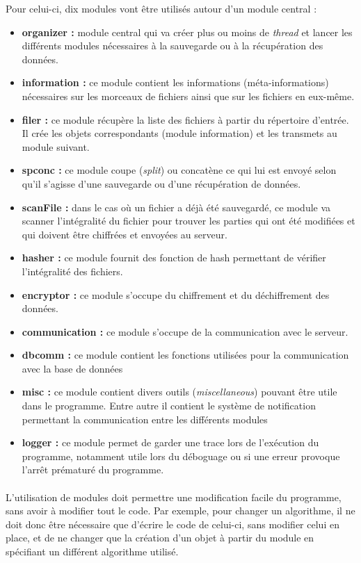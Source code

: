 \documentclass[a4paper,10pt, twoside]{report}
\begin{document}
\begin{spacing}{1.2}
Pour celui-ci, dix modules vont \^etre utilis\'es autour d'un module central :
\begin{itemize}
  \item \textbf{organizer :} module central qui va cr\'eer plus ou moins de
  \textit{thread} et lancer les diff\'erents modules n\'ecessaires \`a la
  sauvegarde ou \`a la r\'ecup\'eration des donn\'ees.
  \item \textbf{information :} ce module contient les informations
  (m\'eta-informations) n\'ecessaires sur les morceaux de fichiers ainsi que
  sur les fichiers en eux-m\^eme.
  \item \textbf{filer :} ce module r\'ecup\`ere la liste des fichiers \`a
  partir du r\'epertoire d'entr\'ee. Il cr\'ee les objets correspondants
  (module information) et les transmets au module suivant.
  \item \textbf{spconc :} ce module coupe (\textit{split}) ou concat\`ene ce
  qui lui est envoy\'e selon qu'il s'agisse d'une sauvegarde ou d'une
  r\'ecup\'eration de donn\'ees.
  \item \textbf{scanFile :} dans le cas o\`u un fichier a d\'ej\`a \'et\'e
  sauvegard\'e, ce module va scanner l'int\'egralit\'e du fichier pour trouver
  les parties qui ont \'et\'e modifi\'ees et qui doivent \^etre chiffr\'ees et
  envoy\'ees au serveur.
  \item \textbf{hasher :} ce module fournit des fonction de hash permettant de
  v\'erifier l'int\'egralit\'e des fichiers.
  \item \textbf{encryptor :} ce module s'occupe du chiffrement et du
  d\'echiffrement des donn\'ees.
  \item \textbf{communication :} ce module s'occupe de la communication avec
  le serveur.
  \item \textbf{dbcomm :} ce module contient les fonctions utilis\'ees pour la
  communication avec la base de donn\'ees
  \item \textbf{misc :} ce module contient divers outils
  (\textit{miscellaneous}) pouvant \^etre utile dans le programme. Entre autre
  il contient le syst\`eme de notification permettant la communication entre
  les diff\'erents modules
  \item \textbf{logger :} ce module permet de garder une trace lors de
  l'ex\'ecution du programme, notamment utile lors du d\'eboguage ou si une
  erreur provoque l'arr\^et pr\'ematur\'e du programme.
\end{itemize}

\paragraph{}
L'utilisation de modules doit permettre une modification facile du programme,
sans avoir \`a modifier tout le code. Par exemple, pour changer un algorithme,
il ne doit donc \^etre n\'ecessaire que d'\'ecrire le code de celui-ci, sans
modifier celui en place, et de ne changer que la cr\'eation d'un objet \`a
partir du module en sp\'ecifiant un diff\'erent algorithme utilis\'e.


\end{spacing}
\end{document}
